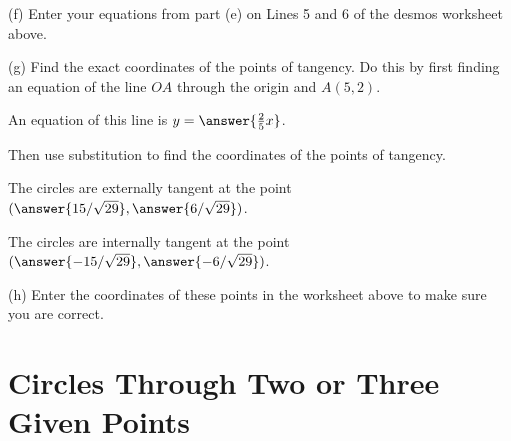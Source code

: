 \documentclass{ximera}
\begin{document}
\begin{question}
(f) Enter your equations from part (e) on Lines 5 and 6 of the desmos worksheet above.  

(g) Find the exact coordinates of the points of tangency. Do this by first finding an equation of the line $OA$ through the origin and $A(5,2)$. 

An equation of this line is $y=\answer{\frac{2}{5}x}$.

Then use substitution to find the coordinates of the points of tangency.

The circles are externally tangent at the point $(\answer{15/\sqrt{29}}, \answer{6/\sqrt{29}})$.

 The circles are internally tangent at the point $(\answer{-15/\sqrt{29}}, \answer{-6/\sqrt{29}})$.

(h) Enter the coordinates of these points in the worksheet above to make sure you are correct.

\end{question}


\section*{Circles Through Two or Three Given Points}
\end{document}
